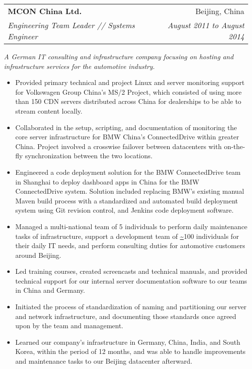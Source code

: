 \documentclass[a4paper,11pt]{article}
\makeatletter
\newcommand{\resitem}[1]{\item #1 \vspace{-2pt}}
\newcommand{\ressubheading}[4]{
\begin{tabular*}{6.5in}{l@{\cftdotfill{\cftsecdotsep}\extracolsep{\fill}}r}
        \textbf{#1} & #2 \\
        \textit{#3} & \textit{#4} \\
\end{tabular*}\vspace{-6pt}}
\makeatother
\begin{document}
\begin{itemize}
    \ressubheading{MCON China Ltd.}{Beijing, China}{Engineering Team Leader // Systems Engineer}{August 2011 to August 2014}
    \linebreak
    \linebreak
    \emph{A German IT consulting and infrastructure company focusing on hosting and infrastructure services for the automotive industry.}
    \begin{itemize}
            \resitem{Provided primary technical and project Linux and server monitoring support for Volkswagen Group China’s MS/2 Project, which consisted of using more than 150 CDN servers distributed across China for dealerships to be able to stream content locally.}

            \resitem{Collaborated in the setup, scripting, and documentation of monitoring the core server infrastructure for BMW China's ConnectedDrive within greater China. Project involved a crosswise failover between datacenters with on-the-fly synchronization between the two locations.}

            \resitem{Engineered a code deployment solution for the BMW ConnectedDrive team in Shanghai to deploy dashboard apps in China for the BMW ConnectedDrive system. Solution included replacing BMW's existing manual Maven build process with a standardized and automated build deployment system using Git revision control, and Jenkins code deployment software.}

            \resitem{Managed a multi-national team of 5 individuals to perform daily maintenance tasks of infrastructure, support a development team of \url{~}100 individuals for their daily IT needs, and perform consulting duties for automotive customers around Beijing.}

            \resitem{Led training courses, created screencasts and technical manuals, and provided technical support for our internal server documentation software to our teams in China and Germany.}

            \resitem{Initiated the process of standardization of naming and partitioning our server and network infrastructure, and documenting those standards once agreed upon by the team and management.}

            \resitem{Learned our company’s infrastructure in Germany, China, India, and South Korea, within the period of 12 months, and was able to handle improvements and maintenance tasks to our Beijing datacenter afterward.}

    \end{itemize}


\end{itemize}
\end{document}
